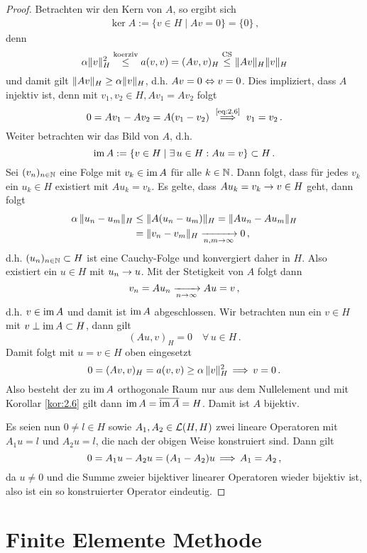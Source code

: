 \begin{proof}
Betrachten wir den Kern von $A$, so ergibt sich
\begin{align}\label{eq:2.6}
	\ker A := \{ v \in H \mid Av = 0\} = \{0\} \, ,
\end{align}
denn
\[
	\alpha \lVert v\rVert_H^2 \stackrel{\scriptsize \text{koerziv}}\le a(v,v)  = (Av,v)_H \stackrel{\scriptsize \text{CS}}\le \lVert Av\rVert_H \lVert v\rVert_H 
\]
und damit gilt $\lVert Av\rVert_H \ge \alpha \lVert v\rVert_H$, d.h. $Av = 0 \Leftrightarrow v = 0$. Dies impliziert, dass $A$ injektiv ist, denn mit $v_1,v_2\in H, Av_1 = Av_2$ folgt
\[
	0 = Av_1 - Av_2 = A(v_1-v_2) \ \stackrel{\scriptsize\eqref{eq:2.6}}\lra \ v_1 = v_2 \, .
\]
Weiter betrachten wir das Bild von $A$, d.h.
\[
	\operatorname{im} A := \{ v \in H \mid \exists \, u \in H : Au = v \} \subset H\, .
\]
Sei $(v_n)_{n \in \mathbb{N}}$ eine Folge mit $v_k \in \operatorname{im} A $ für alle $k \in \mathbb{N}$. Dann folgt, dass für jedes $v_k$ ein $u_k \in H$ existiert mit $A u_k = v_k$. Es gelte, dass $Au_k = v_k \rightarrow v \in H$ geht, dann folgt
\begin{align*}
	\alpha \, \lVert u_n -u_m\rVert_H & \le \lVert A(u_n-u_m)\rVert_H = \lVert Au_n-Au_m\rVert_H \\
	& = \lVert v_n-v_m\rVert_H \xrightarrow[n,m\rightarrow \infty]{} 0 \, ,
\end{align*}
d.h. $(u_n)_{n\in \mathbb{N}} \subset H$ ist eine Cauchy-Folge und konvergiert daher in $H$. Also existiert ein $u \in H$ mit $u_n \rightarrow u$. Mit der Stetigkeit von $A$ folgt dann
\[
	v_n = A u_n \xrightarrow[n\rightarrow \infty]{} Au = v\, ,
\]
d.h. $v \in \operatorname{im} A$ und damit ist $\operatorname{im} A$ abgeschlossen. Wir betrachten nun ein $v \in H$ mit $v \perp \operatorname{im} A \subset H$, dann gilt
\[
	(Au,v)_H = 0 \quad \forall \, u \in H \, .
\]
Damit folgt mit $u = v \in H$ oben eingesetzt
\[
	 0 = (Av,v)_H = a(v,v) \ge \alpha \, \lVert v\rVert_H^2 \, \Longrightarrow \, v = 0 \, .
\]
Also besteht der zu $\operatorname{im} A$ orthogonale Raum nur aus dem Nullelement und mit Korollar \ref{kor:2.6} gilt dann $\operatorname{im} A = \overline{\operatorname{im} A} = H$. Damit ist $A$ bijektiv.

Es seien nun $0 \not = l\in H$ sowie $A_1,A_2 \in \mathcal L(H,H)$ zwei lineare Operatoren mit $A_1u = l$ und $A_2 u = l$, die nach der obigen Weise konstruiert sind. Dann gilt
\[
	0 = A_1 u - A_2 u = (A_1 - A_2)u \, \Longrightarrow \, A_1 = A_2 \, , 
\]
da $u \not = 0$ und die Summe zweier bijektiver linearer Operatoren wieder bijektiv ist, also ist ein so konstruierter Operator eindeutig.
\end{proof}






\section{Finite Elemente Methode}
\label{kap:2.3}


